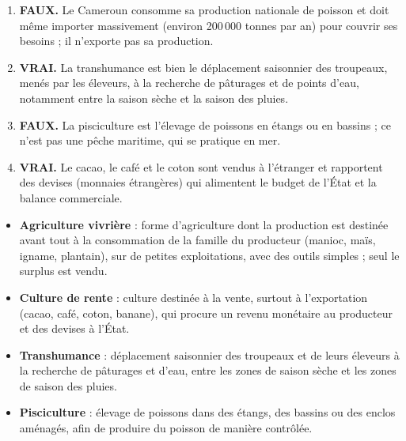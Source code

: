 \documentclass[11pt]{article}
\begin{document}
\begin{corrige}
\begin{enumerate}
\item \textbf{FAUX.} Le Cameroun consomme sa production nationale de poisson et doit même importer massivement (environ 200\,000 tonnes par an) pour couvrir ses besoins ; il n'exporte pas sa production.
\item \textbf{VRAI.} La transhumance est bien le déplacement saisonnier des troupeaux, menés par les éleveurs, à la recherche de pâturages et de points d'eau, notamment entre la saison sèche et la saison des pluies.
\item \textbf{FAUX.} La pisciculture est l'élevage de poissons en étangs ou en bassins ; ce n'est pas une pêche maritime, qui se pratique en mer.
\item \textbf{VRAI.} Le cacao, le café et le coton sont vendus à l'étranger et rapportent des devises (monnaies étrangères) qui alimentent le budget de l'État et la balance commerciale.
\end{enumerate}
\end{corrige}

\begin{corrige}
\begin{itemize}
\item \textbf{Agriculture vivrière} : forme d'agriculture dont la production est destinée avant tout à la consommation de la famille du producteur (manioc, maïs, igname, plantain), sur de petites exploitations, avec des outils simples ; seul le surplus est vendu.
\item \textbf{Culture de rente} : culture destinée à la vente, surtout à l'exportation (cacao, café, coton, banane), qui procure un revenu monétaire au producteur et des devises à l'État.
\item \textbf{Transhumance} : déplacement saisonnier des troupeaux et de leurs éleveurs à la recherche de pâturages et d'eau, entre les zones de saison sèche et les zones de saison des pluies.
\item \textbf{Pisciculture} : élevage de poissons dans des étangs, des bassins ou des enclos aménagés, afin de produire du poisson de manière contrôlée.
\end{itemize}
\end{corrige}
\end{document}

